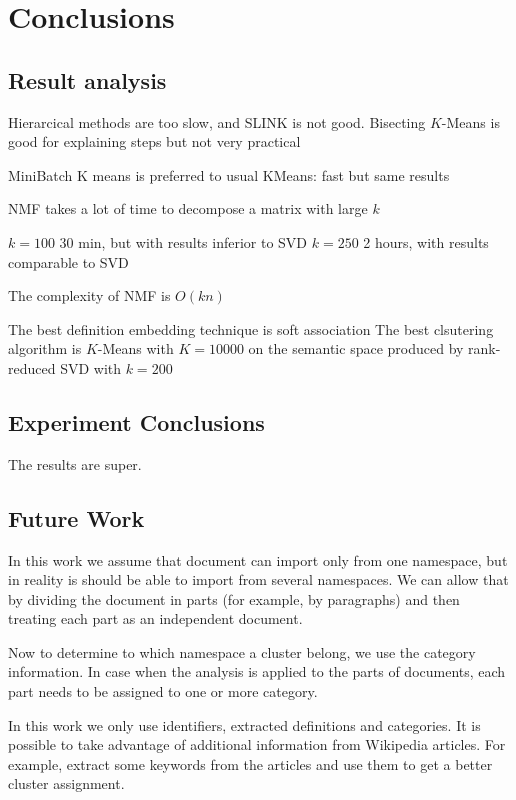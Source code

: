 \section{Conclusions}

\subsection{Result analysis}

Hierarcical methods are too slow, and SLINK is not good.
Bisecting $K$-Means is good for explaining steps but not very practical

MiniBatch K means is preferred to usual KMeans:
fast but same results

NMF takes a lot of time to decompose a matrix with large
$k$

 $k=100$ 30 min, but with results inferior to SVD
 $k=250$ 2 hours, with results comparable to SVD

The complexity of NMF is $O(kn)$


The best definition embedding technique is soft association
The best clsutering algorithm is $K$-Means with $K=10000$
on the semantic space produced by rank-reduced SVD with $k = 200$


\subsection{Experiment Conclusions}

The results are super.



\subsection{Future Work}

In this work we assume that document can import only from one namespace,
but in reality is should be able to import from several namespaces. 
We can allow that by dividing the document in parts (for example, by paragraphs) 
and then treating each part as an independent document. 

Now to determine to which namespace a cluster belong, we use the category 
information. In case when the analysis is applied to the parts of documents, 
each part needs to be assigned to one or more category. 

In this work we only use identifiers, extracted definitions and categories. 
It is possible to take advantage of additional information from Wikipedia 
articles. For example, extract some keywords from the articles 
and use them to get a better cluster assignment. 

